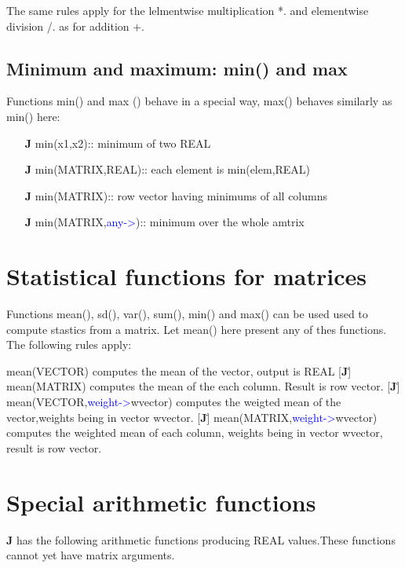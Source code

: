 \begin{itemize}
\begin{itemize}
\end{itemize}
The same rules apply for the lelmentwise multiplication *. and elementwise
division /. as for addition +.
\subsection{Minimum and maximum: \textcolor{VioletRed}{min}() and \textcolor{VioletRed}{max}}
\label{minmax}
Functions \textcolor{VioletRed}{min}() and max ()
behave in a special way, \textcolor{VioletRed}{max}() behaves similarly as \textcolor{VioletRed}{min}() here:
\begin{itemize}
\item[\textbf{J}] \textcolor{VioletRed}{min}(x1,x2):: minimum of two REAL
\item[\textbf{J}] \textcolor{VioletRed}{min}(MATRIX,REAL):: each element is \textcolor{VioletRed}{min}(elem,REAL)
\item[\textbf{J}] \textcolor{VioletRed}{min}(MATRIX):: row vector having minimums of all columns
\item[\textbf{J}] \textcolor{VioletRed}{min}(MATRIX,\textcolor{blue}{any->}):: minimum over the whole amtrix
\end{itemize}
\section{Statistical functions for matrices}
\label{matrixstat}
Functions \textcolor{VioletRed}{mean}(), \textcolor{VioletRed}{sd}(), \textcolor{VioletRed}{var}(), \textcolor{VioletRed}{sum}(), \textcolor{VioletRed}{min}() and \textcolor{VioletRed}{max}()
can be used used to compute stastics from a matrix. Let \textcolor{VioletRed}{mean}() here present
any of thes functions. The following rules apply:
\begin{itemize}
[\textbf{J}\.] \textcolor{VioletRed}{mean}(VECTOR) computes the mean of the vector, output is REAL
[\textbf{J}\.] \textcolor{VioletRed}{mean}(MATRIX) computes the mean of the each column. Result is row vector.
[\textbf{J}\.] \textcolor{VioletRed}{mean}(VECTOR,\textcolor{blue}{weight->}wvector) computes the
weigted mean of the vector,weights being in vector wvector.
[\textbf{J}\.] \textcolor{VioletRed}{mean}(MATRIX,\textcolor{blue}{weight->}wvector) computes the
weighted mean of each column, weights being in vector wvector, result is row vector.

\end{itemize}
\section{Special arithmetic functions}
\label{Special}
\textbf{J} has the following arithmetic functions producing REAL values.These functions cannot yet have
matrix arguments.

\end{itemize}
